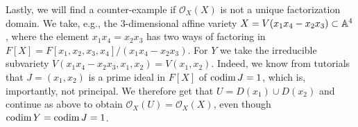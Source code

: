 \documentclass[a4paper, 12pt]{article}
\begin{document}
\begin{Exercise}
    Lastly, we will find a counter-example if $\mathcal{O}_X(X)$ is not a unique factorization domain.
    We take, e.g., the $3$-dimensional affine variety $X = V(x_1x_4 - x_2x_3) \subset \mathbb{A}^4$,
    where the element $x_1x_4 = x_2x_3$ has two ways of factoring in $F[X] = F[x_1,x_2,x_3,x_4]/(x_1x_4 - x_2x_3)$.
    For $Y$ we take the irreducible subvariety $V(x_1x_4-x_2x_3, x_1, x_2) = V(x_1, x_2)$.
    Indeed, we know from tutorials that $J = (x_1, x_2)$ is a prime ideal in $F[X]$ of $\operatorname{codim} J = 1$, which is, importantly, not principal.
    We therefore get that $U = D(x_1) \cup D(x_2)$ and continue as above to obtain $\mathcal{O}_X(U) = \mathcal{O}_X(X)$, even though $\operatorname{codim} Y = \operatorname{codim} J = 1$.
\end{Exercise}
\end{document}
